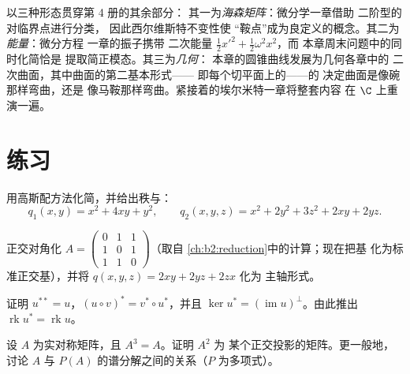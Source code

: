 \begin{remark}[本分册内的展望]
以三种形态贯穿第 4 册的其余部分：
其一为\emph{海森矩阵}：微分学一章借助
二阶型的对临界点进行分类，
因此西尔维斯特不变性使
“鞍点”成为良定义的概念。其二为\emph{能量}：微分方程
一章的振子携带
二次能量 $\frac12x'^2 + \frac12\omega^2x^2$，而
本章周末问题中的同时化简恰是
提取简正模态。其三为\emph{几何}：
本章的圆锥曲线发展为几何各章中的
二次曲面，其中曲面的第二基本形式——
即每个切平面上的——的
决定曲面是像碗那样弯曲，还是
像马鞍那样弯曲。紧接着的埃尔米特一章将整套内容
在 $\C$ 上重演一遍。
\end{remark}

\section{练习}

\begin{exercise}[$\star$]\label{exo:b2:quadratic:1}
用高斯配方法化简，并给出秩与：
\[
q_1(x,y) = x^2 + 4xy + y^2,
\qquad
q_2(x,y,z) = x^2 + 2y^2 + 3z^2 + 2xy + 2yz .
\]
\end{exercise}

\begin{exercise}[$\star$]\label{exo:b2:quadratic:2}
正交对角化 $A = \begin{pmatrix} 0 & 1 & 1\\ 1 & 0 &
1\\ 1 & 1 & 0\end{pmatrix}$（取自
\cref{ch:b2:reduction}中的计算；现在把基
化为标准正交基），并将 $q(x,y,z) = 2xy + 2yz + 2zx$ 化为
主轴形式。
\end{exercise}

\begin{exercise}[$\star$]\label{exo:b2:quadratic:3}
证明 $u^{**} = u$，$(u \circ v)^* = v^* \circ u^*$，并且
$\ker u^* = (\operatorname{im} u)^{\perp}$。由此推出
$\operatorname{rk} u^* = \operatorname{rk} u$。
\end{exercise}

\begin{exercise}[$\star\star$]\label{exo:b2:quadratic:4}
设 $A$ 为实对称矩阵，且 $A^3 = A$。证明 $A^2$ 为
某个正交投影的矩阵。更一般地，讨论
$A$ 与 $P(A)$ 的谱分解之间的关系（$P$ 为多项式）。
\end{exercise}

